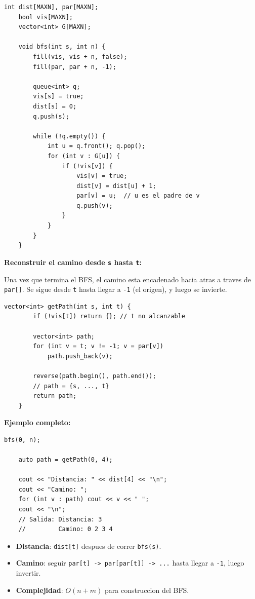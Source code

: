\begin{lstlisting}[caption=BFS con reconstruccion de camino]
	int dist[MAXN], par[MAXN];
	bool vis[MAXN];
	vector<int> G[MAXN];
	
	void bfs(int s, int n) {
		fill(vis, vis + n, false);
		fill(par, par + n, -1);
		
		queue<int> q;
		vis[s] = true;
		dist[s] = 0;
		q.push(s);
		
		while (!q.empty()) {
			int u = q.front(); q.pop();
			for (int v : G[u]) {
				if (!vis[v]) {
					vis[v] = true;
					dist[v] = dist[u] + 1;
					par[v] = u;  // u es el padre de v
					q.push(v);
				}
			}
		}
	}
\end{lstlisting}

\textbf{Reconstruir el camino desde \texttt{s} hasta \texttt{t}:}

Una vez que termina el BFS, el camino esta encadenado hacia atras a traves de \texttt{par[]}. Se sigue desde \texttt{t} hasta llegar a \texttt{-1} (el origen), y luego se invierte.

\begin{lstlisting}[caption=Funcion para reconstruir el camino]
	vector<int> getPath(int s, int t) {
		if (!vis[t]) return {}; // t no alcanzable
		
		vector<int> path;
		for (int v = t; v != -1; v = par[v])
			path.push_back(v);
		
		reverse(path.begin(), path.end());
		// path = {s, ..., t}
		return path;
	}
\end{lstlisting}

\textbf{Ejemplo completo:}

\begin{lstlisting}[caption=Ejemplo s=0 a t=4]
	bfs(0, n);
	
	auto path = getPath(0, 4);
	
	cout << "Distancia: " << dist[4] << "\n";
	cout << "Camino: ";
	for (int v : path) cout << v << " ";
	cout << "\n";
	// Salida: Distancia: 3
	//         Camino: 0 2 3 4
\end{lstlisting}

\begin{itemize}
    \item \textbf{Distancia}: \texttt{dist[t]} despues de correr \texttt{bfs(s)}.
    \item \textbf{Camino}: seguir \texttt{par[t] -> par[par[t]] -> ...} hasta llegar a \texttt{-1}, luego invertir.
    \item \textbf{Complejidad}: $O(n + m)$ para construccion del BFS.
\end{itemize}


